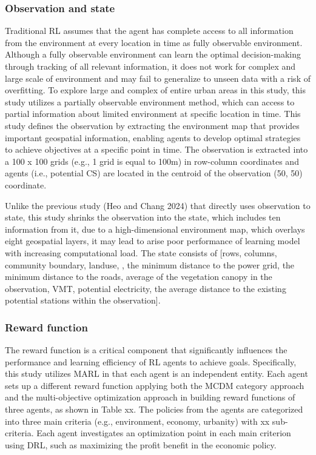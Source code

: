 \documentclass[preprint,12pt]{elsarticle}
\begin{document}
\subsubsection{Observation and state}
Traditional RL assumes that the agent has complete access to all information from the environment at every location in time as fully observable environment. Although a fully observable environment can learn the optimal decision-making through tracking of all relevant information, it does not work for complex and large scale of environment and may fail to generalize to unseen data with a risk of overfitting. To explore large and complex of entire urban areas in this study, this study utilizes a partially observable environment method, which can access to partial information about limited environment at specific location in time. This study defines the observation by extracting the environment map that provides important geospatial information, enabling agents to develop optimal strategies to achieve objectives at a specific point in time. The observation is extracted into a 100 x 100 grids (e.g., 1 grid is equal to 100m) in row-column coordinates and agents (i.e., potential CS) are located in the centroid of the observation (50, 50) coordinate. 

Unlike the previous study (Heo and Chang 2024) that directly uses observation to state, this study shrinks the observation into the state, which includes ten information from it, due to a high-dimensional environment map, which overlays eight geospatial layers, it may lead to arise poor performance of learning model with increasing computational load. The state consists of [rows, columns, community boundary, landuse, \alpha, the minimum distance to the power grid, the minimum distance to the roads, average of the vegetation canopy in the observation, VMT, potential electricity, the average distance to the existing potential stations within the observation].

\subsubsection{Reward function}
The reward function is a critical component that significantly influences the performance and learning efficiency of RL agents to achieve goals. Specifically, this study utilizes MARL in that each agent is an independent entity. Each agent sets up a different reward function applying both the MCDM category approach and the multi-objective optimization approach in building reward functions of three agents, as shown in Table xx. The policies from the agents are categorized into three main criteria (e.g., environment, economy, urbanity) with xx sub-criteria. Each agent investigates an optimization point in each main criterion using DRL, such as maximizing the profit benefit in the economic policy.
\end{document}
